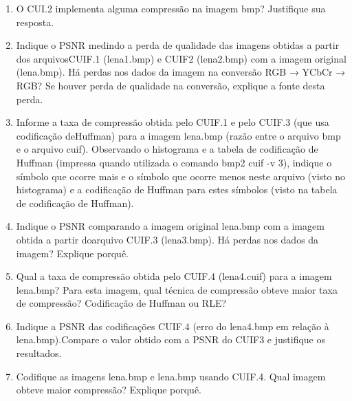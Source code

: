 \documentclass[12pt, a4paper, oneside]{abntex2}
\begin{document}
    \printcoverufsc

    \begin{enumerate}
        \item O CUI.2 implementa alguma compressão na imagem bmp?
                Justifique sua resposta.

        \item Indique o PSNR medindo a perda de qualidade das imagens obtidas a partir dos arquivosCUIF.1 (lena1.bmp) e CUIF2 (lena2.bmp) com a imagem original (lena.bmp).
            Há perdas nos dados da imagem na conversão RGB → YCbCr → RGB? Se houver perda de qualidade na conversão, explique a fonte desta perda.

        \item Informe a taxa de compressão obtida pelo CUIF.1 e pelo CUIF.3 (que usa codificação deHuffman) para a imagem lena.bmp (razão entre o arquivo bmp e o arquivo cuif).
            Observando o histograma e a tabela de codificação de Huffman (impressa quando utilizada o comando bmp2 cuif -v 3), indique o símbolo que ocorre mais e o símbolo que ocorre menos neste arquivo (visto no histograma) e a codificação de Huffman para estes símbolos (visto na tabela de codificação de Huffman).

        \item Indique o PSNR comparando a imagem original lena.bmp com a imagem obtida a partir doarquivo CUIF.3 (lena3.bmp).
            Há perdas nos dados da imagem?
            Explique porquê.

        \item Qual a taxa de compressão obtida pelo CUIF.4 (lena4.cuif) para a imagem lena.bmp?
                Para esta imagem, qual técnica de compressão obteve maior taxa de compressão?
                Codificação de Huffman ou RLE?

        \item Indique a PSNR das codificações CUIF.4 (erro do lena4.bmp em relação à lena.bmp).Compare o valor obtido com a PSNR do CUIF3 e justifique os resultados.

        \item Codifique as imagens lena.bmp e lena.bmp usando CUIF.4. Qual imagem obteve maior compressão?
                Explique porquê.


    \end{enumerate}
\end{document}
